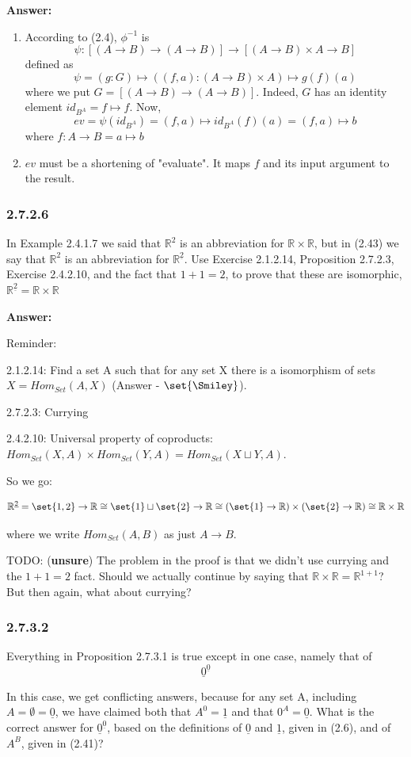 \documentclass{article}
\newcommand{\Rational}{\mathbb{R}}
\newcommand{\Rat}{\mathbb{R}}
\newcommand{\vsp}[0]{\vspace*{10pt}\par}
\newcommand{\exercise}[1]{\subsubsection*{#1}}
\newcommand{\ans}[0]{\vsp\textbf{Answer: }\vsp}
\newcommand{\unsure}[0]{TODO: (\textbf{unsure}) }
\newcommand{\ei}{\item}
\newcommand{\eb}{\begin{enumerate}[label=(\alph*)]\ei}
\newcommand{\ee}{\end{enumerate}}
\begin{document}
\ans

\eb According to (2.4),
$\phi^{-1}$ is
\[
\psi : [(A \to B) \to (A \to B)] \to [(A \to B) \times A \to B]
\]
defined as
\[
\psi = (g:G) \mapsto ((f, a): (A \to B)\times A) \mapsto g(f)(a)
\]
where we put $G = [(A \to B) \to (A \to B)]$. Indeed, $G$ has an identity
element $id_{B^A} = f \mapsto f$.
Now, \[ev = \psi(id_{B^A}) = (f,a) \mapsto id_{B^A}(f)(a) = (f,a) \mapsto b\]
where $f: A \to B = a \mapsto b$

\ei $ev$ must be a shortening of "evaluate". It maps $f$ and its input argument
    to the result.

\ee

\exercise{2.7.2.6}

In Example 2.4.1.7 we said that $\Rational^2$ is an abbreviation for $\Rational
\times \Rational$, but in (2.43) we say that $\Rational^2$ is an abbreviation
for $\Rational^{\underline{2}}$. Use Exercise 2.1.2.14, Proposition 2.7.2.3,
Exercise 2.4.2.10, and the fact that $1+1=2$, to prove that these are
isomorphic, $\Rational^{\underline{2}} = \Rational \times \Rational$

\ans

Reminder:

2.1.2.14: Find a set A such that for any set X there is a isomorphism of sets $X
= Hom_{Set}(A,X)$ (Answer - $\set{\Smiley}$).

2.7.2.3: Currying

2.4.2.10: Universal property of coproducts: $Hom_{Set}(X,A) \times
Hom_{Set}(Y,A) = Hom_{Set}(X \sqcup Y, A)$.


So we go:

\[
\Rat^{\underline 2} = \set{1,2} \to \Rat \cong \set{1} \sqcup \set{2} \to
\Rat \cong (\set{1} \to \Rat) \times (\set{2} \to \Rat) \cong \Rat \times \Rat
\]

where we write $Hom_{Set}(A,B)$ as just $A \to B$.

\unsure The problem in the proof is that we didn't use currying and the $1+1=2$
fact. Should we actually continue by saying that $\Rat \times \Rat =
\Rat^{1+1}$? But then again, what about currying?

\exercise{2.7.3.2}

Everything in Proposition 2.7.3.1 is true except in one case, namely
that of
\[
  \underline{0}^{\underline{0}}
\]

In this case, we get conflicting answers, because for any set A, including $A =
\emptyset = \underline{0}$, we have claimed both that $A^0 = \underline{1}$ and
that $0^A = \underline{0}$.  What is the correct answer for
$\underline{0}^{\underline{0}}$, based on the definitions of $\underline{0}$ and
$\underline{1}$, given in (2.6), and of $A^B$, given in (2.41)?
\end{document}
